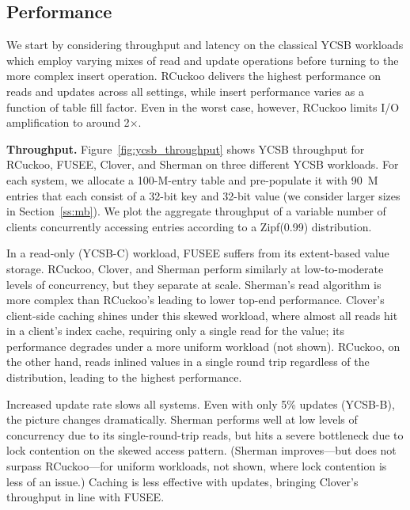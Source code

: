 


\subsection{Performance}

We start by considering throughput and latency on the classical YCSB
workloads which employ varying mixes of read and update operations
before turning to the more complex insert operation.  RCuckoo delivers
the highest performance on reads and updates across all settings,
while insert performance varies as a function of table fill factor.
Even in the worst case, however, RCuckoo limits I/O amplification to
around 2$\times$.

\textbf{Throughput.} Figure~\ref{fig:ycsb_throughput} shows YCSB
throughput for RCuckoo, FUSEE, Clover, and Sherman on three different
YCSB workloads. For each system, we allocate a 100-M-entry table and
pre-populate it with 90~M entries that each consist of a 32-bit key
and 32-bit value (we consider larger sizes in Section~\ref{ss:mb}).
We plot the aggregate throughput of a variable number of clients
concurrently accessing entries according to a Zipf(0.99) distribution.

In a read-only (YCSB-C) workload, FUSEE suffers from its extent-based
value storage.  RCuckoo, Clover, and Sherman perform similarly at
low-to-moderate levels of concurrency, but they separate at scale.
Sherman's read algorithm is more complex than RCuckoo's leading to
lower top-end performance.  Clover's client-side caching shines under
this skewed workload, where almost all reads hit in a client's index
cache, requiring only a single read for the value; its performance
degrades under a more uniform workload (not shown).  RCuckoo, on the
other hand, reads inlined values in a single round trip
regardless of the distribution, leading to the highest performance.


Increased update rate slows all systems.  Even with only 5\% updates (YCSB-B), the picture changes
dramatically.  Sherman performs well at low levels of concurrency due to its
single-round-trip reads, but hits a severe bottleneck due to lock contention on the skewed access
pattern.  (Sherman improves---but does not surpass RCuckoo---for uniform workloads,
not shown, where lock contention is less of an issue.) Caching is less effective with updates,
bringing Clover's throughput in line with FUSEE.

